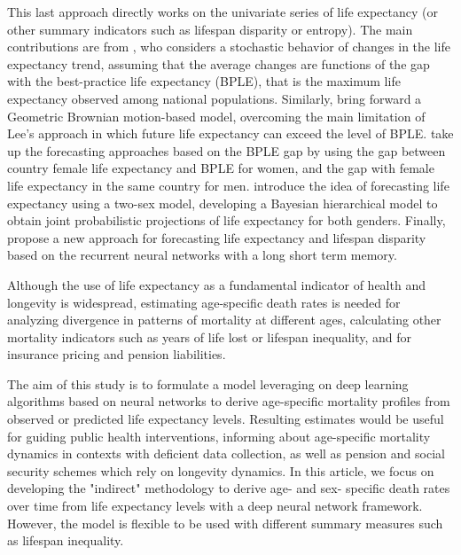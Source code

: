 \documentclass[a4,11pt]{article}
\begin{document}
This last approach directly works on the univariate series of life expectancy (or other summary indicators such as lifespan disparity or entropy). The main contributions are from \cite{Lee2006}, who considers a stochastic behavior of changes in the life expectancy trend, assuming that the average changes are functions of the gap with the best-practice life expectancy (BPLE), that is the maximum life expectancy observed among national populations. Similarly, \cite{TorriVaupel12} bring forward a Geometric Brownian motion-based model, overcoming the main limitation of Lee's approach in which future life expectancy can exceed the level of BPLE. \cite{Pascariu18} take up the forecasting approaches based on the BPLE gap by using the gap between country female life expectancy and BPLE for women, and the gap with female life expectancy in the same country for men. \cite{Raftery13} introduce the idea of forecasting life expectancy using a two-sex model, developing a Bayesian hierarchical model to obtain joint probabilistic projections of life expectancy for both genders. Finally, \cite{Nigri19} propose a new approach for forecasting life expectancy and lifespan disparity based on the recurrent neural networks with a long short
term memory.

Although the use of life expectancy as a fundamental indicator of health and longevity is widespread, estimating age-specific death rates is needed for analyzing divergence in patterns of mortality at different ages, calculating other mortality indicators such as years of life lost or lifespan inequality, and for insurance pricing and pension liabilities.

The aim of this study is to formulate a model leveraging on deep learning algorithms based on neural networks to derive age-specific mortality profiles from observed or predicted life expectancy levels. Resulting estimates would be useful for guiding public health interventions, informing about age-specific mortality dynamics in contexts with deficient data collection, as well as pension and social security schemes which rely on longevity dynamics. In this article, we focus on developing the "indirect" methodology to derive age- and sex- specific death rates over time from life expectancy levels with a deep neural network framework. However, the model is flexible to be used with different summary measures such as lifespan inequality.
\end{document}

